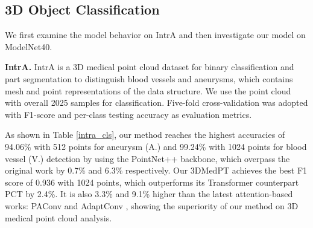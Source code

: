 \documentclass[10pt,twocolumn,letterpaper]{article}
\begin{document}
\subsection{3D Object Classification} \label{cls}
We first examine the model behavior on IntrA and then investigate our model on ModelNet40.


\noindent \textbf{IntrA.}
IntrA \cite{yang2020intra} is a 3D medical point cloud dataset for binary classification and part segmentation to distinguish blood vessels and aneurysms, which contains mesh and point representations of the data structure.
We use the point cloud with overall 2025 samples for classification.
Five-fold cross-validation was adopted with F1-score and per-class testing accuracy as evaluation metrics.

As shown in Table \ref{intra_cls}, our method reaches the highest accuracies of 94.06\% with 512 points for aneurysm (A.) and 99.24\% with 1024 points for blood vessel (V.) detection by using the PointNet++ backbone, which overpass the original work by 0.7\% and 6.3\% respectively. 
Our 3DMedPT achieves the best F1 score of 0.936 with 1024 points, which outperforms its Transformer counterpart PCT by 2.4\%.
It is also 3.3\% and 9.1\% higher than the latest attention-based works: PAConv \cite{paconv} and AdaptConv \cite{adapconv}, showing the superiority of our method on 3D medical point cloud analysis.
\end{document}
